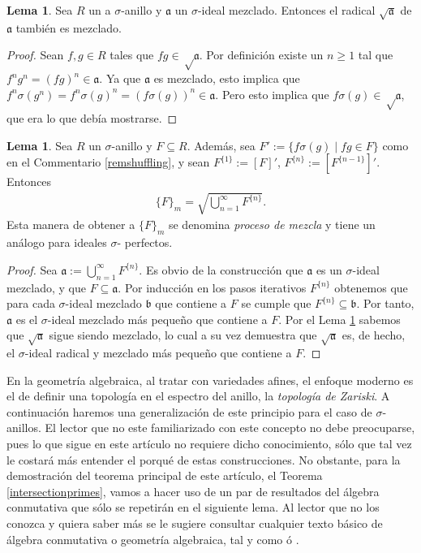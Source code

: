 \documentclass[letterpaper]{article}
\def\a{\mathfrak{a}}
\def\b{\mathfrak{b}}
\def\s{\sigma}
\theoremstyle{definition}
\newtheorem{lem}[Satz]{Lema}
\begin{document}
\begin{lem}\label{sqrtmixed}
Sea $R$ un a $\sigma$-anillo y $\a$ un $\sigma$-ideal mezclado. Entonces el radical $\sqrt{\a}$ de $\a$ tambi\'en es mezclado. \end{lem}

\begin{proof}
Sean $f,g \in R$ tales que $fg \in \sqrt \a$. Por definici\'on existe un $n \geq 1$ tal que $f^n g^n = (fg)^n \in \a$. Ya que $\a$ es mezclado, esto implica que $f^n \s(g^n) = f^n \s(g)^n = (f\s(g))^n \in \a$. 
Pero esto implica que $f\s(g) \in \sqrt \a$, que era lo que deb\'ia mostrarse.
\end{proof}


\begin{lem}\label{lemsuffling}
Sea $R$ un $\sigma$-anillo y $F \subseteq R$. Adem\'as, sea $F' := \{f\s(g) \mid fg \in F \}$ como en el Commentario \ref{remshuffling}, y sean $F^{\{1\}}:= [F]'$, $F^{\{n\}}:= [F^{\{n-1\}}]'$. Entonces
\begin{align} \{F\}_m = \sqrt{\bigcup_{n=1}^{\infty} F^{\{n\}}}. \end{align}
Esta manera de obtener a $\{F\}_m$ se denomina \emph{proceso de mezcla} y tiene un an\'alogo para ideales $\sigma$- perfectos. 
\begin{proof}
Sea $\a:= \bigcup_{n=1}^{\infty} F^{\{n\}}$. Es obvio de la construcci\'on que $\a$ es un $\sigma$-ideal mezclado, y que $F \subseteq \a$. 
Por inducci\'on en los pasos iterativos $F^{\{n\}}$ obtenemos que para cada $\sigma$-ideal mezclado $\b$ que contiene a $F$ se cumple que $F^{\{n\}} \subseteq \b$. Por tanto, $\a$ es el $\sigma$-ideal mezclado m\'as peque\~no que contiene a $F$.
Por el Lema \ref{sqrtmixed} sabemos que $\sqrt{\a}$ sigue siendo mezclado, lo cual a su vez demuestra que $\sqrt{\a}$ es, de hecho, el $\sigma$-ideal radical y mezclado m\'as peque\~no que contiene a $F$. 
\end{proof}
\end{lem}

En la geometr\'ia algebraica, al tratar con variedades afines, el enfoque moderno es el de definir una topolog\'ia en el espectro del anillo, la \emph{topolog\'ia de Zariski}. A continuaci\'on haremos una generalizaci\'on de este principio para el caso de $\sigma$-anillos. El lector que no este familiarizado con este concepto no debe preocuparse, 
pues lo que sigue en este art\'iculo no requiere dicho conocimiento, s\'olo que tal vez le costar\'a m\'as entender el porqu\'e de estas construcciones. 
No obstante, para la demostraci\'on del teorema principal de este art\'iculo, el Teorema \ref{intersectionprimes}, vamos a hacer uso de un par de resultados del \'algebra conmutativa
que s\'olo se repetir\'an en el siguiente lema. Al lector que no los conozca y quiera saber m\'as se le sugiere consultar cualquier texto b\'asico de \'algebra conmutativa o geometr\'ia algebraica,
tal y como \cite{eisenbud} \'o \cite{hartshorne}.
\end{document}
